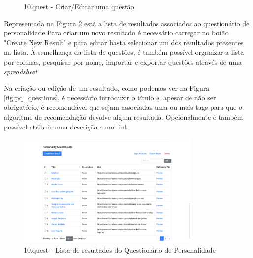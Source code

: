 \begin{figure}[ht!]
\begin{center}
\begin{minipage}{0.45\textwidth}
\begin{center}
				\caption{10.quest - Criar/Editar uma questão}
				\label{fig:pq_q2}
			\end{center}
		\end{minipage}
	\end{center}
\end{figure}

\newpage

Representada na Figura \ref{fig:pq_results} está a lista de resultados associados ao questionário de personalidade.Para criar um novo resultado é necessário carregar no botão "Create New Result" e para editar basta selecionar um dos resultados presentes na lista. À semelhança da lista de questões, é também possível organizar a lista por colunas, pesquisar por nome, importar e exportar questões através de uma \textit{spreadsheet}.

Na criação ou edição de um resultado, como podemos ver na Figura \ref{fig:pq_questions}, é necessário introduzir o título e, apesar de não ser obrigatório, é recomendável que sejam associadas uma ou mais tags para que o algoritmo de recomendação devolve algum resultado. Opcionalmente é também possível atribuir uma descrição e um link.

\begin{figure}[ht!]
	\begin{center}
		\includegraphics[width=0.8\textwidth]{img/product/pq_results}
		\caption{10.quest - Lista de resultados do Questionário de Personalidade}
		\label{fig:pq_results}
	\end{center}
\end{figure}

